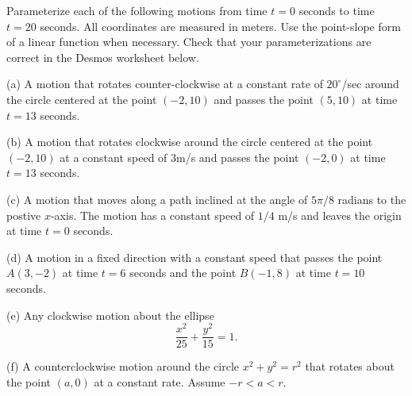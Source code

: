 \documentclass{ximera}
\begin{document}
\begin{question}  \label{Q2:Cosine}
Parameterize each of the following motions from time $t=0$ seconds to time $t=20$ seconds.  All coordinates are measured in meters. Use the point-slope form of a linear function when necessary. Check that your parameterizations are correct in the Desmos worksheet  below. 

(a) A motion that rotates counter-clockwise at a constant rate of $20^\circ$/sec around the circle centered at the point $(-2,10)$ and passes the point $(5,10)$ at time $t=13$ seconds. 

(b) A motion that rotates clockwise around the circle centered at the point $(-2,10)$ at a constant speed of $3$m/s  and passes the point $(-2,0)$ at time $t=13$ seconds. 

(c) A motion that moves along a path inclined at the angle of $5\pi/8$ radians to the postive $x$-axis. The motion has a constant speed of $1/4$ m/s and leaves the origin at time $t=0$ seconds.

(d) A motion in a fixed direction with a constant speed that passes the point $A(3,-2)$ at time $t=6$ seconds and the point $B(-1,8)$ at time $t=10$ seconds.

(e) Any clockwise motion about the ellipse
\[
   \frac{x^2}{25} + \frac{y^2}{15} = 1 .
\]

(f) A counterclockwise motion around the circle $x^2+y^2=r^2$ that rotates about the point $(a,0)$ at a constant rate. Assume $-r<a<r$.

 
\begin{onlineOnly}
    \begin{center}
\end{center}
\end{onlineOnly}


\end{question}
\end{document}
